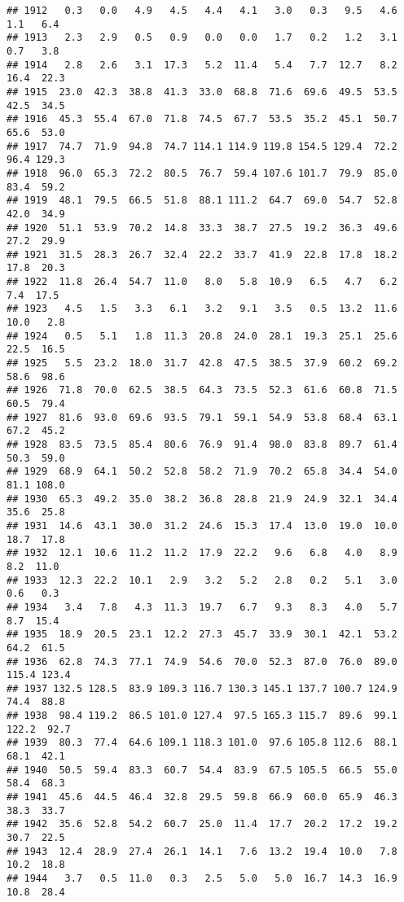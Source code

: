 \documentclass[
]{article}
\begin{document}
\begin{verbatim}
## 1912   0.3   0.0   4.9   4.5   4.4   4.1   3.0   0.3   9.5   4.6   1.1   6.4
## 1913   2.3   2.9   0.5   0.9   0.0   0.0   1.7   0.2   1.2   3.1   0.7   3.8
## 1914   2.8   2.6   3.1  17.3   5.2  11.4   5.4   7.7  12.7   8.2  16.4  22.3
## 1915  23.0  42.3  38.8  41.3  33.0  68.8  71.6  69.6  49.5  53.5  42.5  34.5
## 1916  45.3  55.4  67.0  71.8  74.5  67.7  53.5  35.2  45.1  50.7  65.6  53.0
## 1917  74.7  71.9  94.8  74.7 114.1 114.9 119.8 154.5 129.4  72.2  96.4 129.3
## 1918  96.0  65.3  72.2  80.5  76.7  59.4 107.6 101.7  79.9  85.0  83.4  59.2
## 1919  48.1  79.5  66.5  51.8  88.1 111.2  64.7  69.0  54.7  52.8  42.0  34.9
## 1920  51.1  53.9  70.2  14.8  33.3  38.7  27.5  19.2  36.3  49.6  27.2  29.9
## 1921  31.5  28.3  26.7  32.4  22.2  33.7  41.9  22.8  17.8  18.2  17.8  20.3
## 1922  11.8  26.4  54.7  11.0   8.0   5.8  10.9   6.5   4.7   6.2   7.4  17.5
## 1923   4.5   1.5   3.3   6.1   3.2   9.1   3.5   0.5  13.2  11.6  10.0   2.8
## 1924   0.5   5.1   1.8  11.3  20.8  24.0  28.1  19.3  25.1  25.6  22.5  16.5
## 1925   5.5  23.2  18.0  31.7  42.8  47.5  38.5  37.9  60.2  69.2  58.6  98.6
## 1926  71.8  70.0  62.5  38.5  64.3  73.5  52.3  61.6  60.8  71.5  60.5  79.4
## 1927  81.6  93.0  69.6  93.5  79.1  59.1  54.9  53.8  68.4  63.1  67.2  45.2
## 1928  83.5  73.5  85.4  80.6  76.9  91.4  98.0  83.8  89.7  61.4  50.3  59.0
## 1929  68.9  64.1  50.2  52.8  58.2  71.9  70.2  65.8  34.4  54.0  81.1 108.0
## 1930  65.3  49.2  35.0  38.2  36.8  28.8  21.9  24.9  32.1  34.4  35.6  25.8
## 1931  14.6  43.1  30.0  31.2  24.6  15.3  17.4  13.0  19.0  10.0  18.7  17.8
## 1932  12.1  10.6  11.2  11.2  17.9  22.2   9.6   6.8   4.0   8.9   8.2  11.0
## 1933  12.3  22.2  10.1   2.9   3.2   5.2   2.8   0.2   5.1   3.0   0.6   0.3
## 1934   3.4   7.8   4.3  11.3  19.7   6.7   9.3   8.3   4.0   5.7   8.7  15.4
## 1935  18.9  20.5  23.1  12.2  27.3  45.7  33.9  30.1  42.1  53.2  64.2  61.5
## 1936  62.8  74.3  77.1  74.9  54.6  70.0  52.3  87.0  76.0  89.0 115.4 123.4
## 1937 132.5 128.5  83.9 109.3 116.7 130.3 145.1 137.7 100.7 124.9  74.4  88.8
## 1938  98.4 119.2  86.5 101.0 127.4  97.5 165.3 115.7  89.6  99.1 122.2  92.7
## 1939  80.3  77.4  64.6 109.1 118.3 101.0  97.6 105.8 112.6  88.1  68.1  42.1
## 1940  50.5  59.4  83.3  60.7  54.4  83.9  67.5 105.5  66.5  55.0  58.4  68.3
## 1941  45.6  44.5  46.4  32.8  29.5  59.8  66.9  60.0  65.9  46.3  38.3  33.7
## 1942  35.6  52.8  54.2  60.7  25.0  11.4  17.7  20.2  17.2  19.2  30.7  22.5
## 1943  12.4  28.9  27.4  26.1  14.1   7.6  13.2  19.4  10.0   7.8  10.2  18.8
## 1944   3.7   0.5  11.0   0.3   2.5   5.0   5.0  16.7  14.3  16.9  10.8  28.4

\end{verbatim}
\end{document}
